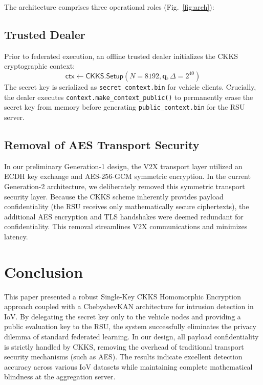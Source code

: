 \documentclass[conference]{IEEEtran}
\begin{document}
The architecture comprises three operational roles (Fig.~\ref{fig:arch}):

\subsection{Trusted Dealer}
Prior to federated execution, an offline trusted dealer initializes the CKKS
cryptographic context:
\begin{equation}
  \mathsf{ctx} \leftarrow \mathsf{CKKS.Setup}(N=8192, \mathbf{q}, \Delta=2^{40})
\end{equation}
The secret key is serialized as \texttt{secret\_context.bin} for vehicle
clients. Crucially, the dealer executes \texttt{context.make\_context\_public()}
to permanently erase the secret key from memory before generating
\texttt{public\_context.bin} for the RSU server.

\subsection{Removal of AES Transport Security}
In our preliminary Generation-1 design, the V2X transport layer utilized an ECDH
key exchange and AES-256-GCM symmetric encryption. In the current Generation-2
architecture, we deliberately removed this symmetric transport security layer.
Because the CKKS scheme inherently provides payload confidentiality (the RSU
receives only mathematically secure ciphertexts), the additional AES encryption
and TLS handshakes were deemed redundant for confidentiality. This removal streamlines V2X communications and minimizes latency.

\section{Conclusion}
This paper presented a robust Single-Key CKKS Homomorphic Encryption approach 
coupled with a ChebyshevKAN architecture for intrusion detection in IoV. 
By delegating the secret key only to the vehicle nodes and providing a public 
evaluation key to the RSU, the system successfully eliminates the privacy dilemma 
of standard federated learning. In our design, all payload confidentiality is strictly handled 
by CKKS, removing the overhead of traditional transport security mechanisms (such as AES). 
The results indicate excellent detection accuracy across various IoV datasets while maintaining complete mathematical blindness at the aggregation server.
\end{document}
